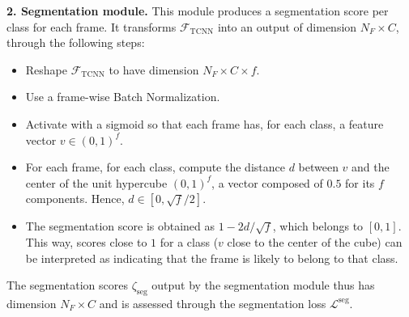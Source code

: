 \documentclass[10pt,twocolumn,letterpaper]{article}
\begin{document}
\textbf{\color{NavyBlue}2. Segmentation module.} This module produces a segmentation score per class for each frame. It transforms $\mathcal{F}_\text{TCNN}$ into an output of dimension $N_F\times C$, through the following steps:
\begin{itemize}
    \item Reshape $\mathcal{F}_\text{TCNN}$ to have dimension $N_F\times C\times f$.
    \item Use a frame-wise Batch Normalization. 
    \item Activate with a sigmoid so that each frame has, for each class, a feature vector $v \in (0,1)^f$.
    \item For each frame, for each class, compute the distance $d$ between $v$ and the center of the unit hypercube $(0,1)^f$, \ie a vector composed of $0.5$ for its $f$ components. Hence, $d\in [0,\sqrt{f}/2]$.
    \item The segmentation score is obtained as $1-2d/\sqrt{f}$, which belongs to $[0,1]$. This way, scores close to $1$ for a class (\ie $v$ close to the center of the cube) can be interpreted as indicating that the frame is likely to belong to that class.
\end{itemize}
The segmentation scores $\zeta_\text{seg}$ output by the segmentation module thus has dimension $N_F\times C$ and is assessed through the segmentation loss $\mathcal{L}^\text{seg}$.
\end{document}
